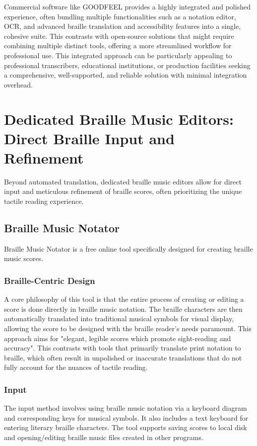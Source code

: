 Commercial software like GOODFEEL provides a highly integrated and polished experience, often bundling multiple functionalities such as a notation editor, OCR, and advanced braille translation and accessibility features into a single, cohesive suite. \cite{dancingdots-goodfeel, canasstech-limealoud} This contrasts with open-source solutions that might require combining multiple distinct tools, offering a more streamlined workflow for professional use. This integrated approach can be particularly appealing to professional transcribers, educational institutions, or production facilities seeking a comprehensive, well-supported, and reliable solution with minimal integration overhead.

\section{Dedicated Braille Music Editors: Direct Braille Input and Refinement}

Beyond automated translation, dedicated braille music editors allow for direct input and meticulous refinement of braille scores, often prioritizing the unique tactile reading experience.

\subsection{Braille Music Notator}
Braille Music Notator is a free online tool specifically designed for creating braille music scores. \cite{pathstoliteracy-notator, braillemusicnotator}

\subsubsection{Braille-Centric Design}
A core philosophy of this tool is that the entire process of creating or editing a score is done directly in braille music notation. The braille characters are then automatically translated into traditional musical symbols for visual display, allowing the score to be designed with the braille reader's needs paramount. This approach aims for "elegant, legible scores which promote sight-reading and accuracy". \cite{pathstoliteracy-notator, braillemusicnotator} This contrasts with tools that primarily translate print notation to braille, which often result in unpolished or inaccurate translations that do not fully account for the nuances of tactile reading. \cite{pathstoliteracy-notator, braillemusicnotator}

\subsubsection{Input}
The input method involves using braille music notation via a keyboard diagram and corresponding keys for musical symbols. It also includes a text keyboard for entering literary braille characters. The tool supports saving scores to local disk and opening/editing braille music files created in other programs. \cite{braillemusicnotator, braillemusicnotator-quickstart}

